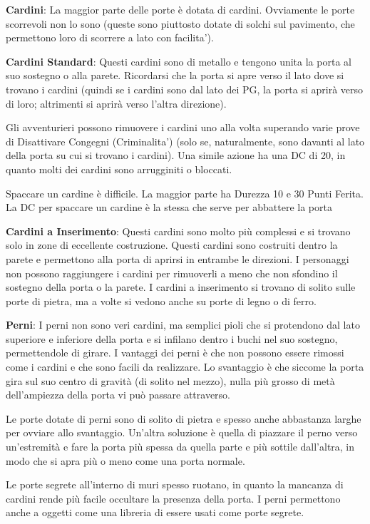 \documentclass[a4paper,11pt,twoside,openany]{book}
\begin{document}
\textbf{Cardini}: La maggior parte delle porte è dotata di cardini. Ovviamente le porte scorrevoli non lo sono (queste sono piuttosto dotate di solchi sul pavimento, che permettono loro di scorrere a lato con facilita').

\textbf{Cardini Standard}: Questi cardini sono di metallo e tengono unita la porta al suo sostegno o alla parete. Ricordarsi che la porta si apre verso il lato dove si trovano i cardini (quindi se i cardini sono dal lato dei PG, la porta si aprirà verso di loro; altrimenti si aprirà verso l’altra direzione).

Gli avventurieri possono rimuovere i cardini uno alla volta superando varie prove di Disattivare Congegni (Criminalita') (solo se, naturalmente, sono davanti al lato della porta su cui si trovano i cardini). Una simile azione ha una DC di 20, in quanto molti dei cardini sono arrugginiti o bloccati.

Spaccare un cardine è difficile. La maggior parte ha Durezza 10 e 30 Punti Ferita. La DC per spaccare un cardine è la stessa che serve per abbattere la porta

\textbf{Cardini a Inserimento}: Questi cardini sono molto più complessi e si trovano solo in zone di eccellente costruzione. Questi cardini sono costruiti dentro la parete e permettono alla porta di aprirsi in entrambe le direzioni. I personaggi non possono raggiungere i cardini per rimuoverli a meno che non sfondino il sostegno della porta o la parete. I cardini a inserimento si trovano di solito sulle porte di pietra, ma a volte si vedono anche su porte di legno o di ferro.

\textbf{Perni}: I perni non sono veri cardini, ma semplici pioli che si protendono dal lato superiore e inferiore della porta e si infilano dentro i buchi nel suo sostegno, permettendole di girare. I vantaggi dei perni è che non possono essere rimossi come i cardini e che sono facili da realizzare. Lo svantaggio è che siccome la porta gira sul suo centro di gravità (di solito nel mezzo), nulla più grosso di metà dell'ampiezza della porta vi può passare attraverso.

Le porte dotate di perni sono di solito di pietra e spesso anche abbastanza larghe per ovviare allo svantaggio. Un'altra soluzione è quella di piazzare il perno verso un'estremità e fare la porta più spessa da quella parte e più sottile dall'altra, in modo che si apra più o meno come una porta normale.

Le porte segrete all'interno di muri spesso ruotano, in quanto la mancanza di cardini rende più facile occultare la presenza della porta. I perni permettono anche a oggetti come una libreria di essere usati come porte segrete.
\end{document}
